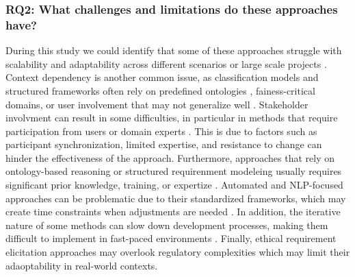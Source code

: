 \subsubsection{RQ2: What challenges and limitations do these approaches have?}
During this study we could identify that some of these approaches struggle with scalability and adaptability across different scenarios or large scale projects \cite{guizzardi2023ontology}. Context dependency is another common issue, as classification models
and structured frameworks often rely on predefined ontologies \cite{silva2024use, 10.1145/3597503.3639185}, fainess-critical domains, or user involvement that may not generalize well .
Stakeholder involvment can result in some difficulties, in particular in methods that require participation from users or domain experts \cite{10.1145/3424953.3426498, silva2024use}. This is due to factors such as participant synchronization, limited expertise, and
resistance to change can hinder the effectiveness of the approach. Furthermore, approaches that rely on ontology-based reasoning or structured requirenment modeleing usually requires significant prior knowledge, training, or
expertize \cite{10.1145/3701625.3701686, guizzardi2023ontology}.
Automated and NLP-focused approaches can be problematic due to their standardized frameworks, which may create time constraints when adjustments are needed \cite{10.1145/3597503.3639185, 10.1145/3701625.3701686}. In addition, the iterative nature of some methods can slow down development processes,
making them difficult to implement in fast-paced environments \cite{guizzardi2023ontology}.
Finally, ethical requirement elicitation approaches may overlook regulatory complexities which may limit their adaoptability in real-world contexts.

